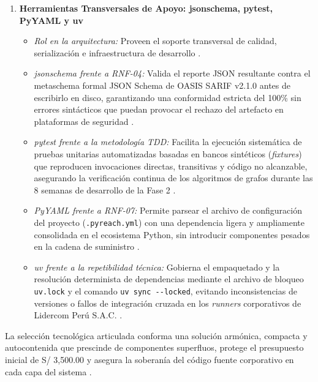 \begin{enumerate}
    \item \textbf{Herramientas Transversales de Apoyo: jsonschema, pytest, PyYAML y uv}
    \begin{itemize}
        \item \textit{Rol en la arquitectura:} Proveen el soporte transversal de calidad, serialización e infraestructura de desarrollo \cite{pressman2020software, martin2017cleanarch}.
        \item \textit{jsonschema frente a RNF-04:} Valida el reporte JSON resultante contra el metaschema formal JSON Schema de OASIS SARIF v2.1.0 antes de escribirlo en disco, garantizando una conformidad estricta del 100\% sin errores sintácticos que puedan provocar el rechazo del artefacto en plataformas de seguridad \cite{oasis2019sarif}.
        \item \textit{pytest frente a la metodología TDD:} Facilita la ejecución sistemática de pruebas unitarias automatizadas basadas en bancos sintéticos (\textit{fixtures}) que reproducen invocaciones directas, transitivas y código no alcanzable, asegurando la verificación continua de los algoritmos de grafos durante las 8 semanas de desarrollo de la Fase 2 \cite{myers2011art, torres2026proyecto}.
        \item \textit{PyYAML frente a RNF-07:} Permite parsear el archivo de configuración del proyecto (\texttt{.\allowbreak pyreach.\allowbreak yml}) con una dependencia ligera y ampliamente consolidada en el ecosistema Python, sin introducir componentes pesados en la cadena de suministro \cite{ladisa2023sok}.
        \item \textit{uv frente a la repetibilidad técnica:} Gobierna el empaquetado y la resolución determinista de dependencias mediante el archivo de bloqueo \texttt{uv.\allowbreak lock} y el comando \texttt{uv sync -\allowbreak -\allowbreak locked}, evitando inconsistencias de versiones o fallos de integración cruzada en los \textit{runners} corporativos de Lidercom Perú S.A.C. \cite{humble2010continuous}.
    \end{itemize}
\end{enumerate}

La selección tecnológica articulada conforma una solución armónica, compacta y autocontenida que prescinde de componentes superfluos, protege el presupuesto inicial de S/ 3,500.00 y asegura la soberanía del código fuente corporativo en cada capa del sistema \cite{torres2026proyecto}.

